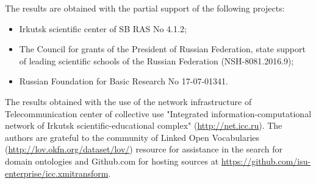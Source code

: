 \documentclass[runningheads]{llncs}
\begin{document}
The results are obtained with the partial support of the following projects:
\begin{itemize}
\item Irkutsk scientific center of SB RAS No 4.1.2;
\item The Council for grants of the President of Russian Federation, state support of leading scientific schools of the Russian Federation (NSH-8081.2016.9);
\item Russian Foundation for Basic Research No 17-07-01341.
\end{itemize}
The results obtained with the use of the network infrastructure of Telecommunication center of collective use "Integrated information-computational network of Irkutsk scientific-educational complex" (\url{http://net.icc.ru}). The authors are grateful to the community of Linked Open Vocabularies (\url{http://lov.okfn.org/dataset/lov/}) resource for assistance in the search for domain ontologies and Github.com for hosting sources at \url{https://github.com/isu-enterprise/icc.xmitransform}.
\end{document}
